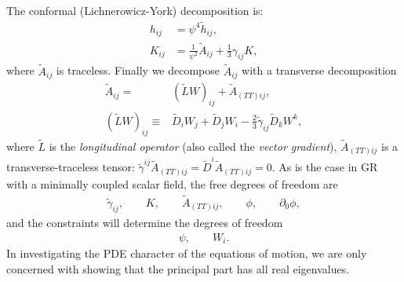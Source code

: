 \documentclass{ws-ijmpd}
\begin{document}
The conformal (Lichnerowicz-York) decomposition is:
\begin{align}
\label{eq:conformal_decomp_1}
   h_{ij}
   &=
   \psi^4\tilde{h}_{ij}
   ,\\
   K_{ij}
   &=
   \frac{1}{\psi^2}\tilde{A}_{ij}
   +
   \frac{1}{3}\gamma_{ij}K
   ,
\end{align}
where $\tilde{A}_{ij}$ is traceless.
Finally we decompose $\tilde{A}_{ij}$ 
with a transverse decomposition
\begin{align}
\label{eq:conformal_decomp_2}
   \tilde{A}_{ij}
   =&
   \left(\tilde{L}W\right)_{ij}
   +
   \tilde{A}_{(TT)ij}
   ,\\
   \left(\tilde{L}W\right)_{ij}
   \equiv&
   \tilde{D}_iW_j
   +
   \tilde{D}_jW_i
   -
   \frac{2}{3}\tilde{\gamma}_{ij}\tilde{D}_kW^k
   ,
\end{align}
where $\tilde{L}$ is the \emph{longitudinal operator}
(also called the \emph{vector gradient}), 
$\tilde{A}_{(TT)ij}$ is a transverse-traceless tensor:
$\tilde{\gamma}^{ij}\tilde{A}_{(TT)ij}=\tilde{D}^i\tilde{A}_{(TT)ij}=0$.
As is the case in GR with a minimally coupled scalar field, 
the free degrees of freedom are
\begin{align}
   \tilde{\gamma}_{ij}
   ,\qquad
   K
   ,\qquad
   \tilde{A}_{(TT)ij}
   ,\qquad
   \phi
   ,\qquad
   \partial_0\phi
   ,
\end{align}
and the constraints will determine the degrees of freedom 
\begin{align}
   \psi
   ,\qquad
   W_i
   .
\end{align}
In investigating the PDE character of the equations of motion,
we are only concerned with showing that the principal part has
all real eigenvalues.
\end{document}
